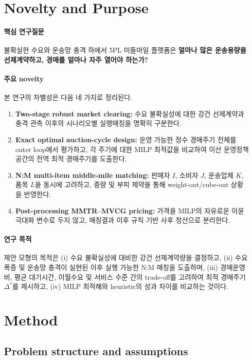 \documentclass[11pt,a4paper]{article}
\begin{document}
\section{Novelty and Purpose}
\paragraph{핵심 연구질문} 불확실한 수요와 운송망 충격 하에서 5PL 미들마일 플랫폼은 \textbf{얼마나 많은 운송용량을 선제계약하고, 경매를 얼마나 자주 열어야 하는가?}

\paragraph{주요 novelty} 본 연구의 차별성은 다음 네 가지로 정리된다.
\begin{enumerate}
    \item \textbf{Two-stage robust market clearing:} 수요 불확실성에 대한 강건 선제계약과 충격 관측 이후의 시나리오별 실행매칭을 명확히 구분한다.
    \item \textbf{Exact optimal auction-cycle design:} 운영 가능한 정수 경매주기 전체를 outer loop에서 평가하고, 각 주기에 대한 MILP 최적값을 비교하여 이산 운영정책 공간의 전역 최적 경매주기를 도출한다.
    \item \textbf{N:M multi-item middle-mile matching:} 판매자 $I$, 소비자 $J$, 운송업체 $K$, 품목 $L$을 동시에 고려하고, 중량 및 부피 제약을 통해 weight-out/cube-out 상황을 반영한다.
    \item \textbf{Post-processing MMTR--MVCG pricing:} 가격을 MILP의 자유로운 이윤극대화 변수로 두지 않고, 매칭결과 이후 규칙 기반 사후 청산으로 분리한다.
\end{enumerate}

\paragraph{연구 목적} 제안 모형의 목적은 (i) 수요 불확실성에 대비한 강건 선제계약량을 결정하고, (ii) 수요 폭증 및 운송망 충격이 실현된 이후 실행 가능한 N:M 매칭을 도출하며, (iii) 경매운영비, 평균 대기시간, 이월수요 및 서비스 수준 간의 trade-off를 고려하여 최적 경매주기 $\Delta^*$를 제시하고, (iv) MILP 최적해와 heuristic의 성과 차이를 비교하는 것이다.

\section{Method}
\subsection{Problem structure and assumptions}
\end{document}
